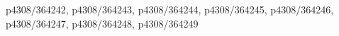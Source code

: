 p4308/364242, p4308/364243, p4308/364244, p4308/364245, p4308/364246, p4308/364247, p4308/364248, p4308/364249